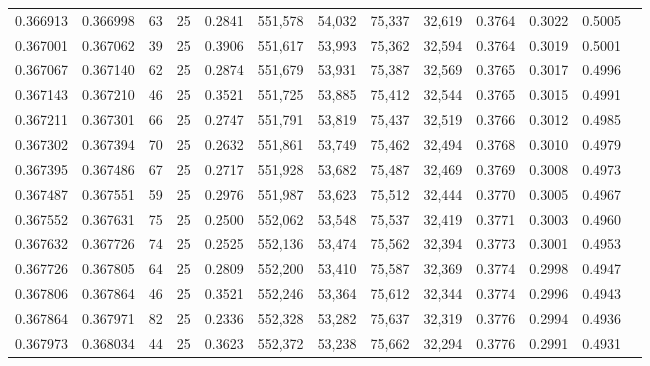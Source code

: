 \begin{tabular}{rrrrrrrrrrrrr}
0.366913 & 0.366998 &    63 &  25 &                                     0.2841 & 551,578 &  54,032 &  75,337 &  32,619 & 0.3764 & 0.3022 & 0.5005 \\
0.367001 & 0.367062 &    39 &  25 &                                     0.3906 & 551,617 &  53,993 &  75,362 &  32,594 & 0.3764 & 0.3019 & 0.5001 \\
0.367067 & 0.367140 &    62 &  25 &                                     0.2874 & 551,679 &  53,931 &  75,387 &  32,569 & 0.3765 & 0.3017 & 0.4996 \\
0.367143 & 0.367210 &    46 &  25 &                                     0.3521 & 551,725 &  53,885 &  75,412 &  32,544 & 0.3765 & 0.3015 & 0.4991 \\
0.367211 & 0.367301 &    66 &  25 &                                     0.2747 & 551,791 &  53,819 &  75,437 &  32,519 & 0.3766 & 0.3012 & 0.4985 \\
0.367302 & 0.367394 &    70 &  25 &                                     0.2632 & 551,861 &  53,749 &  75,462 &  32,494 & 0.3768 & 0.3010 & 0.4979 \\
0.367395 & 0.367486 &    67 &  25 &                                     0.2717 & 551,928 &  53,682 &  75,487 &  32,469 & 0.3769 & 0.3008 & 0.4973 \\
0.367487 & 0.367551 &    59 &  25 &                                     0.2976 & 551,987 &  53,623 &  75,512 &  32,444 & 0.3770 & 0.3005 & 0.4967 \\
0.367552 & 0.367631 &    75 &  25 &                                     0.2500 & 552,062 &  53,548 &  75,537 &  32,419 & 0.3771 & 0.3003 & 0.4960 \\
0.367632 & 0.367726 &    74 &  25 &                                     0.2525 & 552,136 &  53,474 &  75,562 &  32,394 & 0.3773 & 0.3001 & 0.4953 \\
0.367726 & 0.367805 &    64 &  25 &                                     0.2809 & 552,200 &  53,410 &  75,587 &  32,369 & 0.3774 & 0.2998 & 0.4947 \\
0.367806 & 0.367864 &    46 &  25 &                                     0.3521 & 552,246 &  53,364 &  75,612 &  32,344 & 0.3774 & 0.2996 & 0.4943 \\
0.367864 & 0.367971 &    82 &  25 &                                     0.2336 & 552,328 &  53,282 &  75,637 &  32,319 & 0.3776 & 0.2994 & 0.4936 \\
0.367973 & 0.368034 &    44 &  25 &                                     0.3623 & 552,372 &  53,238 &  75,662 &  32,294 & 0.3776 & 0.2991 & 0.4931 \\

\end{tabular}
